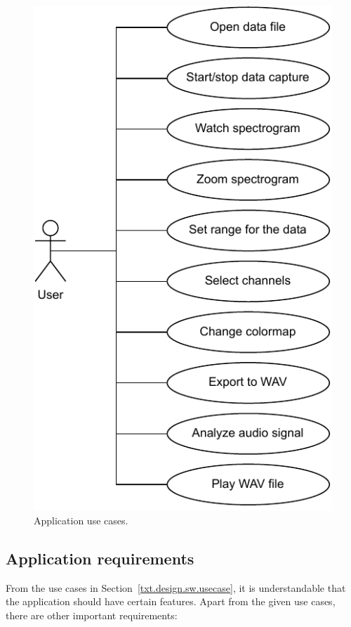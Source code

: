 \begin{figure}[h]
    \centering
    \includegraphics{pdf/usecase.drawio.pdf}
    \caption{Application use cases.}
    \label{fig:usecase}
\end{figure}

\subsection{Application requirements}\label{txt.design.sw.requirements}

From the use cases in Section~\ref{txt.design.sw.usecase}, it is understandable that the application should have certain features. Apart from the given use cases, there are other important requirements:

